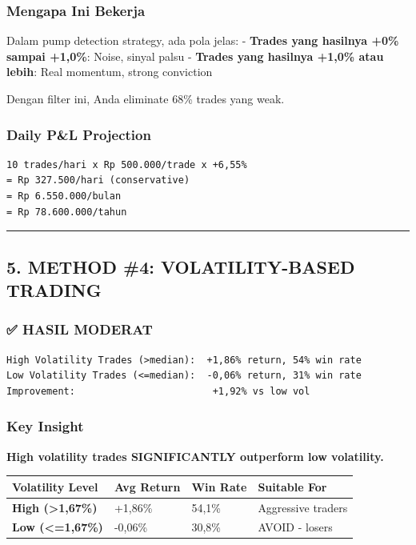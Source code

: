 \documentclass[
  10pt,
  a4paper,
]{article}
\begin{document}
\subsubsection{Mengapa Ini Bekerja}\label{mengapa-ini-bekerja}

Dalam pump detection strategy, ada pola jelas: - \textbf{Trades yang
hasilnya +0\% sampai +1,0\%}: Noise, sinyal palsu - \textbf{Trades yang
hasilnya +1,0\% atau lebih}: Real momentum, strong conviction

Dengan filter ini, Anda eliminate 68\% trades yang weak.

\subsubsection{Daily P\&L Projection}\label{daily-pl-projection}

\begin{verbatim}
10 trades/hari x Rp 500.000/trade x +6,55%
= Rp 327.500/hari (conservative)
= Rp 6.550.000/bulan
= Rp 78.600.000/tahun
\end{verbatim}

\begin{center}\rule{0.5\linewidth}{0.5pt}\end{center}

\subsection{5. METHOD \#4: VOLATILITY-BASED
TRADING}\label{method-4-volatility-based-trading}

\subsubsection{✅ HASIL MODERAT}\label{hasil-moderat}

\begin{verbatim}
High Volatility Trades (>median):  +1,86% return, 54% win rate
Low Volatility Trades (<=median):  -0,06% return, 31% win rate
Improvement:                        +1,92% vs low vol
\end{verbatim}

\subsubsection{Key Insight}\label{key-insight}

\textbf{High volatility trades SIGNIFICANTLY outperform low volatility.}

\begin{longtable}[]{@{}llll@{}}
\toprule\noalign{}
Volatility Level & Avg Return & Win Rate & Suitable For \\
\midrule\noalign{}
\endhead
\bottomrule\noalign{}
\endlastfoot
\textbf{High (\textgreater1,67\%)} & +1,86\% & 54,1\% & Aggressive
traders \\
\textbf{Low (\textless=1,67\%)} & -0,06\% & 30,8\% & AVOID - losers \\
\end{longtable}
\end{document}
